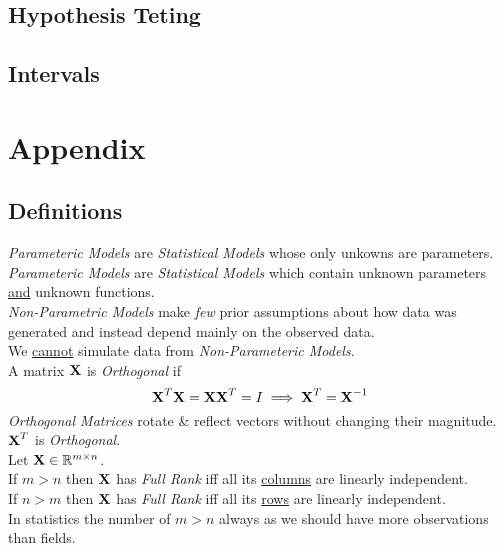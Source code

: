 \documentclass[11pt,a4paper]{article}
\begin{document}


\subsection{Hypothesis Teting}



\subsection{Intervals}

\newpage\setcounter{section}{-1}
\section{Appendix}

\subsection{Definitions}

\textit{Parameteric Models} are \textit{Statistical Models} whose only unkowns are parameters.\\

\textit{Parameteric Models} are \textit{Statistical Models} which contain unknown parameters \underline{and} unknown functions.\\

\textit{Non-Parametric Models} make \textit{few} prior assumptions about how data was generated and instead depend mainly on the observed data.\\
We \underline{cannot} simulate data from \textit{Non-Parameteric Models}.\\

A matrix $\textbf{X}$ is \textit{Orthogonal} if
$$\textbf{X}^T\textbf{X}=\textbf{X}\textbf{X}^T=I\implies\textbf{X}^T=\textbf{X}^{-1}$$
\textit{Orthogonal Matrices} rotate \& reflect vectors without changing their magnitude.\\
\nb $\textbf{X}^T$ is \textit{Orthogonal}.\\

Let $\textbf{X}\in\mathbb{R}^{m\times n}$.\\
If $m>n$ then $\textbf{X}$ has \textit{Full Rank} iff all its \underline{columns} are linearly independent.\\
If $n>m$ then $\textbf{X}$ has \textit{Full Rank} iff all its \underline{rows} are linearly independent.\\
\nb In statistics the number of $m>n$ always as we should have more observations than fields.\\
\end{document}
